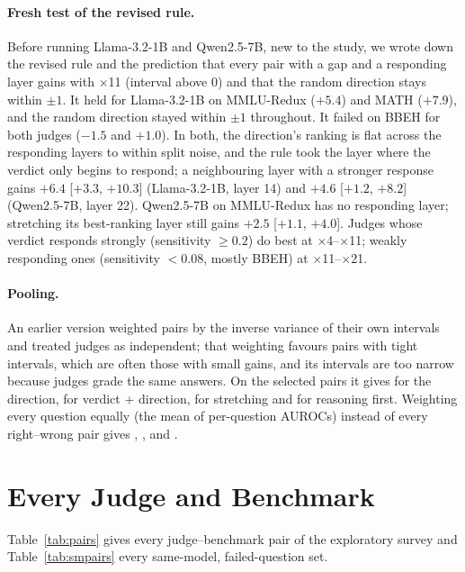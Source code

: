 \paragraph{Fresh test of the revised rule.} Before running Llama-3.2-1B and Qwen2.5-7B, new to the study, we wrote down the revised rule and the prediction that every pair with a gap and a responding layer gains with $\times$11 (interval above 0) and that the random direction stays within $\pm1$. It held for Llama-3.2-1B on MMLU-Redux ($+5.4$) and MATH ($+7.9$), and the random direction stayed within $\pm1$ throughout. It failed on BBEH for both judges ($-1.5$ and $+1.0$). In both, the direction's ranking is flat across the responding layers to within split noise, and the rule took the layer where the verdict only begins to respond; a neighbouring layer with a stronger response gains $+6.4$ [$+3.3$, $+10.3$] (Llama-3.2-1B, layer 14) and $+4.6$ [$+1.2$, $+8.2$] (Qwen2.5-7B, layer 22). Qwen2.5-7B on MMLU-Redux has no responding layer; stretching its best-ranking layer still gains $+2.5$ [$+1.1$, $+4.0$]. Judges whose verdict responds strongly (sensitivity $\ge 0.2$) do best at $\times$4--$\times$11; weakly responding ones (sensitivity $< 0.08$, mostly BBEH) at $\times$11--$\times$21.

\paragraph{Pooling.}
\label{app:pool}
An earlier version weighted pairs by the inverse variance of their own intervals and treated judges as independent; that weighting favours pairs with tight intervals, which are often those with small gains, and its intervals are too narrow because judges grade the same answers. On the selected pairs it gives  for the direction,  for verdict + direction,  for stretching and  for reasoning first. Weighting every question equally (the mean of per-question AUROCs) instead of every right--wrong pair gives , ,  and .

\section{Every Judge and Benchmark}
\label{app:pairs}

Table~\ref{tab:pairs} gives every judge--benchmark pair of the exploratory survey and Table~\ref{tab:smpairs} every same-model, failed-question set.

